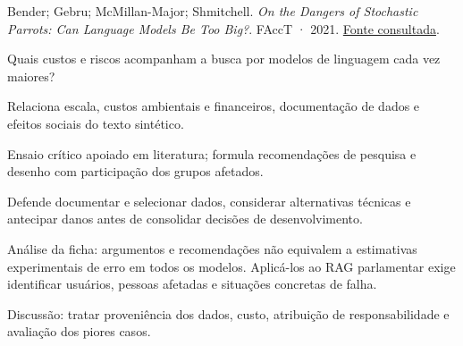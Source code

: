 {\small Bender; Gebru; McMillan-Major; Shmitchell. \textit{On the Dangers of Stochastic Parrots: Can Language Models Be Too Big?}. FAccT · 2021. \href{https://s10251.pcdn.co/pdf/2021-bender-parrots.pdf}{Fonte consultada}.\par}

Quais custos e riscos acompanham a busca por modelos de linguagem cada vez maiores?

Relaciona escala, custos ambientais e financeiros, documentação de dados e efeitos sociais do texto sintético.

Ensaio crítico apoiado em literatura; formula recomendações de pesquisa e desenho com participação dos grupos afetados.

Defende documentar e selecionar dados, considerar alternativas técnicas e antecipar danos antes de consolidar decisões de desenvolvimento.

\begin{itemize}
\end{itemize}

Análise da ficha: argumentos e recomendações não equivalem a estimativas experimentais de erro em todos os modelos. Aplicá-los ao RAG parlamentar exige identificar usuários, pessoas afetadas e situações concretas de falha.

Discussão: tratar proveniência dos dados, custo, atribuição de responsabilidade e avaliação dos piores casos.

